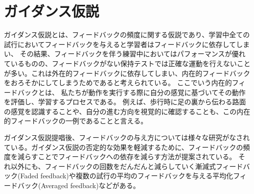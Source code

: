\section{ガイダンス仮説}
ガイダンス仮説\cite{guidance_hypothesis}とは、フィードバックの頻度に関する仮説であり、学習中全ての試行においてフィードバックを与えると学習者はフィードバックに依存してしまい、
その結果、フィードバックを伴う練習中においてはパフォーマンスが優れているものの、フィードバックがない保持テストでは正確な運動を行えないことが多い。これは外在的フィードバックに依存してしまい、内在的フィードバックをおろそかにしてしまうためであると考えられている。
ここでいう内在的フィードバックとは、
私たちが動作を実行する際に自分の感覚に基づいてその動作を評価し、学習するプロセスである。
例えば、歩行時に足の裏から伝わる路面の感覚を認識することや、自分の進む方向を視覚的に確認することも、この内在的フィードバックの一例であることと言える。\cite{nagoyahml_feedback}

ガイダンス仮説提唱後、フィードバックの与え方については様々な研究がなされている。ガイダンス仮説の否定的な効果を軽減するために、フィードバックの頻度を減らすことでフィードバックへの依存を減らす方法が提案されている。
それ以外にも、フィードバックの回数をだんだんと減らしていく漸減式フィードバック(Faded feedback)\cite{Aoyagi2019}や複数の試行の平均のフィードバックを与える平均化フィードバック(Averaged feedback)\cite{Aoyagi2019}などがある。
